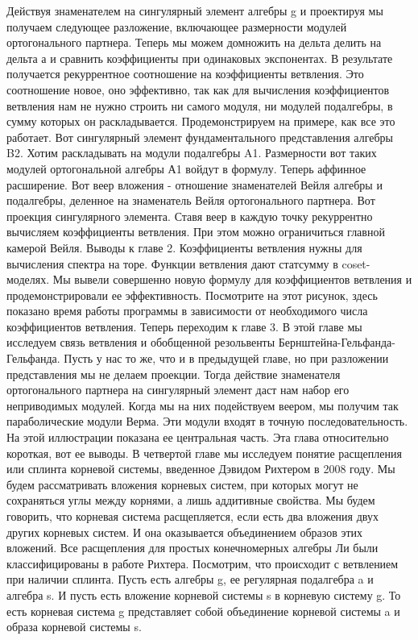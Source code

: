 \documentclass{article}
\begin{document}
Действуя знаменателем на сингулярный элемент алгебры g и проектируя мы получаем следующее разложение, включающее размерности модулей ортогонального партнера. 
Теперь мы можем домножить на дельта делить на дельта а и сравнить коэффициенты при одинаковых экспонентах. В результате получается рекуррентное соотношение на коэффициенты ветвления. 
Это соотношение новое, оно эффективно, так как для вычисления коэффициентов ветвления нам не нужно строить ни самого модуля, ни модулей подалгебры, в сумму которых он раскладывается. 
Продемонстрируем на примере, как все это работает. Вот сингулярный элемент фундаментального представления алгебры B2. Хотим раскладывать на модули подалгебры A1. Размерности вот таких модулей ортогональной алгебры А1 войдут в формулу. 
Теперь аффинное расширение. Вот веер вложения - отношение знаменателей Вейля алгебры и подалгебры, деленное на знаменатель Вейля ортогонального партнера. Вот проекция сингулярного элемента. Ставя веер в каждую точку рекуррентно вычисляем коэффициенты ветвления. При этом можно ограничиться главной камерой Вейля. 
Выводы к главе 2. Коэффициенты ветвления нужны для вычисления спектра на торе. Функции ветвления дают статсумму в coset-моделях. 
Мы вывели совершенно новую формулу для коэффициентов ветвления и продемонстрировали ее эффективность. Посмотрите на этот рисунок, здесь показано время работы программы в зависимости от необходимого числа коэффициентов ветвления. 
Теперь переходим к главе 3. 
В этой главе мы исследуем связь ветвления и обобщенной резольвенты Бернштейна-Гельфанда-Гельфанда. Пусть у нас то же, что и в предыдущей главе, но при разложении представления мы не делаем проекции. Тогда действие знаменателя ортогонального партнера на сингулярный элемент даст нам набор его неприводимых модулей. Когда мы на них подействуем веером, мы получим так параболические модули Верма. Эти модули входят в точную последовательность. На этой иллюстрации показана ее центральная часть. Эта глава относительно короткая, вот ее выводы. 
В четвертой главе мы исследуем понятие расщепления или сплинта корневой системы, введенное Дэвидом Рихтером в 2008 году. Мы будем рассматривать вложения корневых систем, при которых могут не сохраняться углы между корнями, а лишь аддитивные свойства. 
Мы будем говорить, что корневая система расщепляется, если есть два вложения двух других корневых систем. И она оказывается объединением образов этих вложений. 
Все расщепления для простых конечномерных алгебры Ли были классифицированы в работе Рихтера. 
Посмотрим, что происходит с ветвлением при наличии сплинта. 
Пусть есть алгебры g, ее регулярная подалгебра a и алгебра s. И пусть есть вложение корневой системы s в корневую систему g. То есть корневая система g представляет собой объединение корневой системы a и образа корневой системы s.
\end{document}
